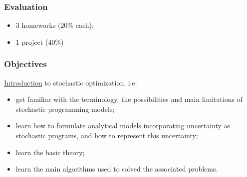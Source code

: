 \documentclass{beamer}
\begin{document}
\begin{frame}
\frametitle{Evaluation}

\begin{itemize}
\item
3 homeworks (20\% each);
\item
1 project (40\%)
\end{itemize}

\end{frame}

\begin{frame}
\frametitle{Objectives}
 
\underline{Introduction} to stochastic optimization, i.e.
\begin{itemize}
\item
get familiar with the terminology, the possibilities and main limitations of stochastic programming models;
\item
learn how to formulate analytical models incorporating uncertainty as stochastic programs, and how to represent this uncertainty;
\item
learn the basic theory;
\item
learn the main algorithms used to solved the associated problems.
\end{itemize}
\end{frame}
\end{document}
